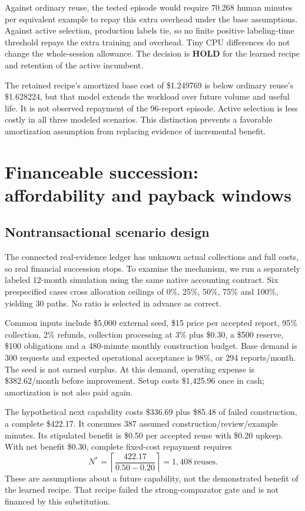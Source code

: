 \documentclass[11pt,letterpaper]{article}
\newcommand{\status}[1]{{\sffamily\bfseries\small #1}}
\newcommand{\usd}[1]{\$#1}
\begin{document}
Against ordinary reuse, the tested episode would require 70.268 human minutes per equivalent example to repay this extra overhead under the base assumptions. Against active selection, production labels tie, so no finite positive labeling-time threshold repays the extra training and overhead. Tiny CPU differences do not change the whole-session allowance. The decision is \status{HOLD} for the learned recipe and retention of the active incumbent.

The retained recipe's amortized base cost of \usd{1.249769} is below ordinary reuse's \usd{1.628224}, but that model extends the workload over future volume and useful life. It is not observed repayment of the 96-report episode. Active selection is less costly in all three modeled scenarios. This distinction prevents a favorable amortization assumption from replacing evidence of incremental benefit.

\section{Financeable succession: affordability and payback windows}
\label{sec:finance}

\subsection{Nontransactional scenario design}

The connected real-evidence ledger has unknown actual collections and full costs, so real financial succession stops. To examine the mechanism, we run a separately labeled 12-month simulation using the same native accounting contract. Six prespecified cases cross allocation ceilings of 0\%, 25\%, 50\%, 75\% and 100\%, yielding 30 paths. No ratio is selected in advance as correct.

Common inputs include \usd{5,000} external seed, \usd{15} price per accepted report, 95\% collection, 2\% refunds, collection processing at 3\% plus \usd{0.30}, a \usd{500} reserve, \usd{100} obligations and a 480-minute monthly construction budget. Base demand is 300 requests and expected operational acceptance is 98\%, or 294 reports/month. The seed is not earned surplus. At this demand, operating expense is \usd{382.62}/month before improvement. Setup costs \usd{1,425.96} once in cash; amortization is not also paid again.

The hypothetical next capability costs \usd{336.69} plus \usd{85.48} of failed construction, a complete \usd{422.17}. It consumes 387 assumed construction/review/example minutes. Its stipulated benefit is \usd{0.50} per accepted reuse with \usd{0.20} upkeep. With net benefit \usd{0.30}, complete fixed-cost repayment requires
\begin{equation}
 N^*=\left\lceil\frac{422.17}{0.50-0.20}\right\rceil=1{,}408\ \text{reuses}.
\end{equation}
These are assumptions about a future capability, not the demonstrated benefit of the learned recipe. That recipe failed the strong-comparator gate and is not financed by this substitution.
\end{document}
